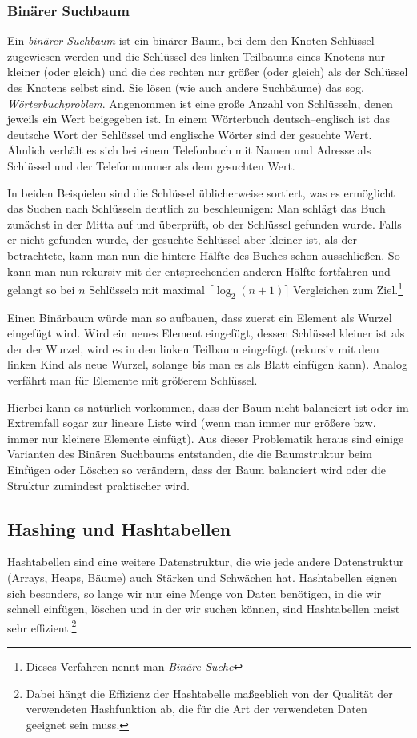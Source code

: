 \subsubsection{Binärer Suchbaum}
Ein \emph{binärer Suchbaum} ist ein binärer Baum, bei dem den Knoten Schlüssel zugewiesen werden und die Schlüssel des linken Teilbaums eines Knotens nur kleiner (oder gleich) und die des rechten nur größer (oder gleich) als der Schlüssel des Knotens selbst sind. Sie lösen (wie auch andere Suchbäume) das sog. \emph{Wörterbuchproblem}. Angenommen ist eine große Anzahl von Schlüsseln, denen jeweils ein Wert beigegeben ist. In einem Wörterbuch deutsch–englisch ist das deutsche Wort der Schlüssel und englische Wörter sind der gesuchte Wert. Ähnlich verhält es sich bei einem Telefonbuch mit Namen und Adresse als Schlüssel und der Telefonnummer als dem gesuchten Wert.

In beiden Beispielen sind die Schlüssel üblicherweise sortiert, was es ermöglicht das Suchen nach Schlüsseln deutlich zu beschleunigen: Man schlägt das Buch zunächst in der Mitta auf und überprüft, ob der Schlüssel gefunden wurde. Falls er nicht gefunden wurde, der gesuchte Schlüssel aber kleiner ist, als der betrachtete, kann man nun die hintere Hälfte des Buches schon ausschließen. So kann man nun rekursiv mit der entsprechenden anderen Hälfte fortfahren und gelangt so bei $n$ Schlüsseln mit maximal $\lceil \log_2(n+1) \rceil $ Vergleichen zum Ziel.\footnote{Dieses Verfahren nennt man \emph{Binäre Suche}}

Einen Binärbaum würde man so aufbauen, dass zuerst ein Element als Wurzel eingefügt wird. Wird ein neues Element eingefügt, dessen Schlüssel kleiner ist als der der Wurzel, wird es in den linken Teilbaum eingefügt (rekursiv mit dem linken Kind als neue Wurzel, solange bis man es als Blatt einfügen kann). Analog verfährt man für Elemente mit größerem Schlüssel.

Hierbei kann es natürlich vorkommen, dass der Baum nicht balanciert ist oder im Extremfall sogar zur lineare Liste wird (wenn man immer nur größere bzw. immer nur kleinere Elemente einfügt). Aus dieser Problematik heraus sind einige Varianten des Binären Suchbaums entstanden, die die Baumstruktur beim Einfügen oder Löschen so verändern, dass der Baum balanciert wird oder die Struktur zumindest praktischer wird.





\subsection{Hashing und Hashtabellen}
Hashtabellen sind eine weitere Datenstruktur, die wie jede andere Datenstruktur (Arrays, Heaps, Bäume) auch Stärken und Schwächen hat. Hashtabellen eignen sich besonders, so lange wir nur eine Menge von Daten benötigen, in die wir schnell einfügen, löschen und in der wir suchen können, sind Hashtabellen meist sehr effizient.\footnote{Dabei hängt die Effizienz der Hashtabelle maßgeblich von der Qualität der verwendeten Hashfunktion ab, die für die Art der verwendeten Daten geeignet sein muss.}

